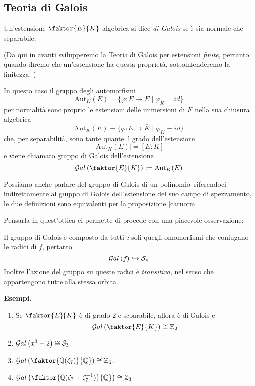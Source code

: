 \subsection{Teoria di Galois}
\begin{multicols}{2}
	
	\begin{definition}
		Un'estensione $ \faktor{E}{K} $ algebrica si dice \emph{di Galois} se è sia normale che separabile.
	\end{definition}
	
	(Da qui in avanti svilupperemo la Teoria di Galois per estensioni \emph{finite}, pertanto quando diremo che un'estensione ha questa proprietà, sottointenderemo la finitezza. )
	
	In questo caso il gruppo degli automorfismi 
	\[ \text{Aut}_K(E) = \{ \varphi : E \to E \mid \varphi_K = id \} \]
	per normalità sono proprio le estensioni delle immersioni di $ K $ nella sua chiusura algebrica
	\[ \text{Aut}_K(E) = \{ \varphi : E \to \bar{K} \mid \varphi_K = id  \} \]
	che, per separabilità, sono tante quante il grado dell'estensione
	\[ |\text{Aut}_K(E)| = [E : K] \]
	e viene chiamato gruppo di Galois dell'estensione
	\[ \Gal{\faktor{E}{K}} := \text{Aut}_K(E) \]
	
	Possiamo anche parlare del gruppo di Galois di un polinomio, riferendoci indirettamente al gruppo di Galois dell'estensione del suo campo di spezzamento, le due definizioni sono equivalenti per la proposizione \ref{carnorm}.
	
	Pensarla in quest'ottica ci permette di procede con una piacevole osservazione:
	\begin{remark}
		Il gruppo di Galois è composto da tutti e soli quegli omomorfismi che coniugano le radici di $ f $, pertanto
		\[ \mathcal{G}al\left( f \right) \hookrightarrow \mathcal{S}_n \]
		Inoltre l'azione del gruppo su queste radici è \emph{transitiva}, nel senso che appartengono tutte alla stessa orbita.
	\end{remark}
	
	\textbf{Esempi.}
	\begin{enumerate}
		\item Se $ \faktor{E}{K} $ è di grado $ 2 $ e separabile, allora è di Galois e
		\[ \Gal{\faktor{E}{K}} \cong \Z_2 \]
		\item $ \mathcal{G}al\left( x^3 -2 \right) \cong \mathcal{S}_3 $
		\item $ \Gal{\faktor{\Q(\zeta_7)}{\Q}} \cong \Z_6 $.
		\item $ \Gal{\faktor{\Q(\zeta_7+ \zeta_7^{-1})}{\Q}} \cong \Z_3 $
	\end{enumerate}
	
	
\end{multicols}